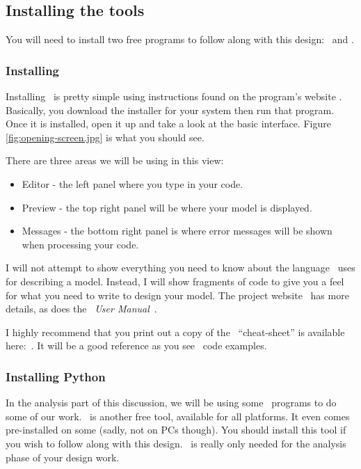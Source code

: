 \subsection{Installing the tools}

You will need to install two free programs to follow along with this design: \osc\ and \PY.

\subsubsection{Installing \osc}

Installing \osc\ is pretty simple using instructions found on the program's 
website \cite{openscad}.
Basically, you download the installer for your system then run that program. Once it is installed, open it up and take a look at the basic
interface.  Figure \ref{fig:opening-screen.jpg} is what you should see.


There are three areas we will be using in this view:

\begin{itemize}
\item{Editor - the left panel where you type in your code.}
\item{Preview - the top right panel will be where your model is displayed.}
\item{Messages - the bottom right panel is where error messages will be shown
when processing your code.}
\end{itemize}

I will not attempt to show everything you need to know about the language \osc\
uses for describing a model. Instead, I will show fragments of code to give you
a feel for what you need to write to design your model. The project
website~\cite{blackr} has more details, as does the \osc\ {\it User
Manual}~\cite{userman}.

I highly recommend that you  print out a copy of the \osc\
``cheat-sheet'' is available here:~\cite{osccheat}. It will be a good reference
as you see \osc\ code examples.

\subsubsection{Installing Python}

In the analysis part of this discussion, we will be using some \PY\ programs to
do some of our work. \PY\ is another free tool, available for all platforms. It
even comes pre-installed on some (sadly, not on PCs though). You should install
this tool if you wish to follow along with this design. \PY\ is really only
needed for the analysis phase of your design work.

